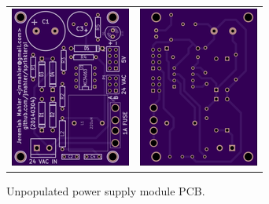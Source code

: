 \documentclass{article}
\begin{document}
\begin{figure}[hbp!]
\begin{center}
\begin{tabular}{c c}
\includegraphics[scale=0.8]{img/power_pcb-20140304-top.png} &
\includegraphics[scale=0.8]{img/power_pcb-20140304-bottom.png}
\end{tabular}
\caption{Unpopulated power supply module PCB.}
\end{center}
\end{figure}
\end{document}
